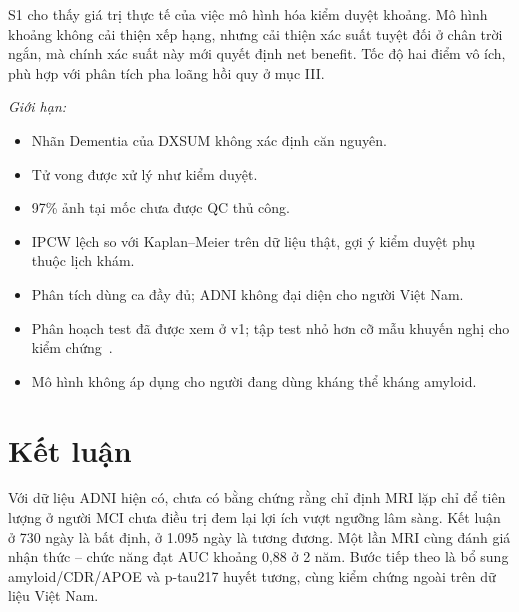\documentclass[conference]{IEEEtran}
\begin{document}
S1 cho thấy giá trị thực tế của việc mô hình hóa kiểm duyệt khoảng. Mô hình khoảng không cải thiện xếp hạng, nhưng cải thiện xác suất tuyệt đối ở chân trời ngắn, mà chính xác suất này mới quyết định net benefit. Tốc độ hai điểm vô ích, phù hợp với phân tích pha loãng hồi quy ở mục III.

\textit{Giới hạn:}
\begin{itemize}
\item Nhãn Dementia của DXSUM không xác định căn nguyên.
\item Tử vong được xử lý như kiểm duyệt.
\item 97\% ảnh tại mốc chưa được QC thủ công.
\item IPCW lệch so với Kaplan–Meier trên dữ liệu thật, gợi ý kiểm duyệt phụ thuộc lịch khám.
\item Phân tích dùng ca đầy đủ; ADNI không đại diện cho người Việt Nam.
\item Phân hoạch test đã được xem ở v1; tập test nhỏ hơn cỡ mẫu khuyến nghị cho kiểm chứng~\cite{riley}.
\item Mô hình không áp dụng cho người đang dùng kháng thể kháng amyloid.
\end{itemize}

\section{Kết luận}
Với dữ liệu ADNI hiện có, chưa có bằng chứng rằng chỉ định MRI lặp chỉ để tiên lượng ở người MCI chưa điều trị đem lại lợi ích vượt ngưỡng lâm sàng. Kết luận ở 730 ngày là bất định, ở 1.095 ngày là tương đương. Một lần MRI cùng đánh giá nhận thức – chức năng đạt AUC khoảng 0,88 ở 2 năm. Bước tiếp theo là bổ sung amyloid/CDR/APOE và p-tau217 huyết tương, cùng kiểm chứng ngoài trên dữ liệu Việt Nam.
\end{document}
